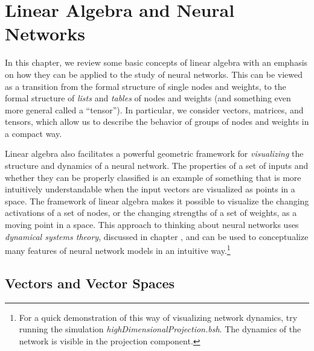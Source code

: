 \chapter{Linear Algebra and Neural Networks}\label{ch_linear_algebra}


In this chapter, we review some basic concepts of linear algebra with an 
emphasis on how they can be applied to the study of neural networks. This can be viewed as a transition from the formal structure of single nodes and weights, to the formal structure of \emph{lists} and \emph{tables} of nodes and weights (and something even more general called a ``tensor''). In particular, we consider vectors, matrices, and tensors, which allow us to describe the behavior of groups of nodes and weights in a compact way.

Linear algebra also facilitates a powerful geometric framework for \emph{visualizing} the structure and dynamics of a neural network. The properties of a set of inputs and whether they can be properly classified is an example of something that is more intuitively understandable when the input vectors are visualized as points in a space. The framework of linear algebra makes it possible to visualize the changing activations of a set of nodes, or the changing strengths of a set of weights, as a moving point in a space. This approach to thinking about neural networks uses \emph{dynamical systems theory}, discussed in chapter , and can be used to conceptualize many features of neural network models in an intuitive way.\footnote{For a quick demonstration of this way of visualizing network dynamics, try running the simulation \emph{highDimensionalProjection.bsh}. The dynamics of the network is visible in the projection component.}  


\section{Vectors and Vector Spaces}\label{sect_vector}

